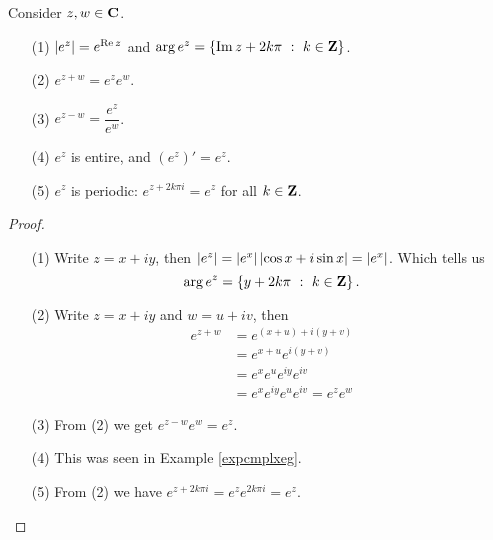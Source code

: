 \begin{proposition}\label{propexp}
Consider $z,w \in \mathbf C$. 
\begin{itemize}
\item[(1)] $\left\lvert e^z\right\rvert = e^{\operatorname{Re} z}$ and $\arg e^z = \left\{\operatorname{Im} z + 2k\pi\ :\ k \in \mathbf Z\right\}$.
\item[(2)] $e^{z + w} = e^ze^w$.
\item[(3)] $e^{z - w} = \dfrac{e^z}{e^w}$.
\item[(4)] $e^z$ is entire, and $(e^z)' = e^z$.
\item[(5)] $e^z$ is periodic: $e^{z + 2k\pi i} = e^z$ for all $k \in \mathbf Z$.
\end{itemize}
\end{proposition}
\begin{proof}\hfill
\begin{itemize}
\item[(1)] Write $z = x + iy$, then $\left\lvert e^z\right\rvert = \left\lvert e^x\right\rvert\left\lvert\cos x + i\sin x\right\rvert = \left\lvert e^x\right\rvert$. Which tells us \[\arg e^z = \left\{y + 2k\pi\ :\ k \in \mathbf Z\right\}.\]
\item[(2)] Write $z = x + iy$ and $w = u + iv$, then
\begin{align*}
e^{z + w} &= e^{(x+u) + i(y + v)}\\[0.5em]
&= e^{x + u}e^{i(y + v)}\\[0.5em]
&= e^x e^u e^{iy} e^{iv}\\[0.5em]
&= e^xe^{iy}e^ue^{iv} = e^ze^w
\end{align*}
\item[(3)] From (2) we get $e^{z-w}e^w = e^z$.
\item[(4)] This was seen in Example \ref{expcmplxeg}.
\item[(5)] From (2) we have $e^{z + 2k\pi i} = e^z e^{2k\pi i} = e^z$.
\end{itemize}
\vspace*{-\baselineskip}
\end{proof}

\bigskip

